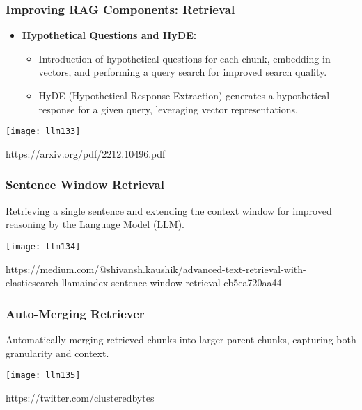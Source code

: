 \begin{frame}[fragile]\frametitle{Improving RAG Components: Retrieval}
  \begin{itemize}
    \item \textbf{Hypothetical Questions and HyDE:}
      \begin{itemize}
        \item Introduction of hypothetical questions for each chunk, embedding in vectors, and performing a query search for improved search quality.
        \item HyDE (Hypothetical Response Extraction) generates a hypothetical response for a given query, leveraging vector representations.
      \end{itemize}
  \end{itemize}
  
\begin{center}
\texttt{[image: llm133]}
\end{center}				

https://arxiv.org/pdf/2212.10496.pdf  
\end{frame}


\begin{frame}[fragile]\frametitle{Sentence Window Retrieval}
Retrieving a single sentence and extending the context window for improved reasoning by the Language Model (LLM).

  
\begin{center}
\texttt{[image: llm134]}
\end{center}				

 https://medium.com/@shivansh.kaushik/advanced-text-retrieval-with-elasticsearch-llamaindex-sentence-window-retrieval-cb5ea720aa44
 
\end{frame}

\begin{frame}[fragile]\frametitle{Auto-Merging Retriever}
Automatically merging retrieved chunks into larger parent chunks, capturing both granularity and context.

  
\begin{center}
\texttt{[image: llm135]}
\end{center}				

https://twitter.com/clusteredbytes
 
\end{frame}

